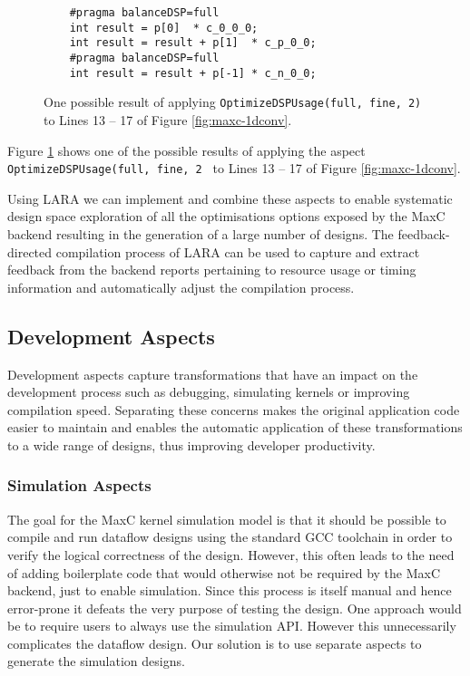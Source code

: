 \newsavebox{\secondlisting}
\begin{lrbox}{\secondlisting}%
  
\end{lrbox}

\begin{figure}
  \begin{lstlisting}
    #pragma balanceDSP=full
    int result = p[0]  * c_0_0_0;
    int result = result + p[1]  * c_p_0_0;
    #pragma balanceDSP=full
    int result = result + p[-1] * c_n_0_0;
  \end{lstlisting}
  \caption{One possible result of applying
    \texttt{OptimizeDSPUsage(full, fine, 2)} to Lines 13 -- 17 of Figure
    \ref{fig:maxc-1dconv}.}
  \label{fig:maxc-1dconv-aspect}
\end{figure}

Figure \ref{fig:maxc-1dconv-aspect} shows one of the possible results
of applying the aspect \texttt{OptimizeDSPUsage(full, fine, 2 } to
Lines 13 -- 17 of Figure \ref{fig:maxc-1dconv}.

Using LARA we can implement and combine these aspects to enable
systematic design space exploration of all the optimisations options
exposed by the MaxC backend resulting in the generation of a large
number of designs. The feedback-directed compilation process of LARA can
be used to capture and extract feedback from the backend reports
pertaining to resource usage or timing information and automatically
adjust the compilation process.

\subsection{Development Aspects}

Development aspects capture transformations that have an impact on the
development process such as debugging, simulating kernels or improving
compilation speed. Separating these concerns makes the original
application code easier to maintain and enables the automatic
application of these transformations to a wide range of designs, thus
improving developer productivity.

\subsubsection{Simulation Aspects}

The goal for the MaxC kernel simulation model is that it should be
possible to compile and run dataflow designs using the standard GCC
toolchain in order to verify the logical correctness of the
design. However, this often leads to the need of adding boilerplate
code that would otherwise not be required by the MaxC backend, just to
enable simulation. Since this process is itself manual and hence
error-prone it defeats the very purpose of testing the design. One
approach would be to require users to always use the simulation
API. However this unnecessarily complicates the dataflow design. Our
solution is to use separate aspects to generate the simulation
designs.

